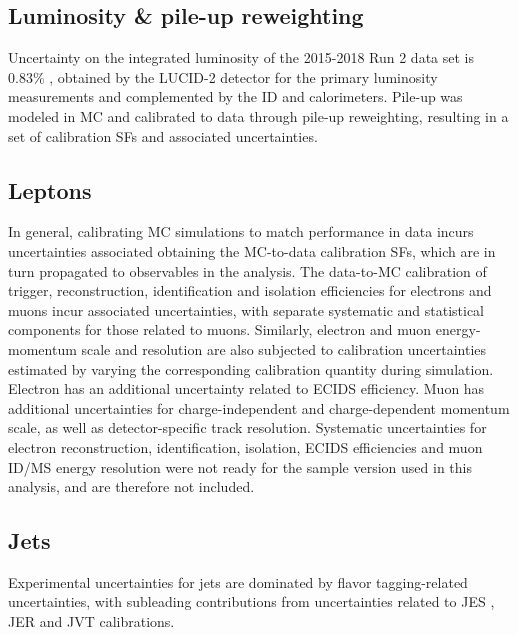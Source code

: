 \documentclass[../thesis.tex]{subfiles}
\begin{document}
\subsection{Luminosity \& pile-up reweighting}
Uncertainty on the integrated luminosity of the 2015-2018 Run 2 data set is $0.83\%$ \citep{DAPR-2021-01}, obtained by the LUCID-2 detector \citep{LUCID2} for the primary luminosity measurements and complemented by the \acs{ID} and calorimeters. Pile-up was modeled in \acs{MC} and calibrated to data through pile-up reweighting, resulting in a set of calibration \acs{SF}s and associated uncertainties.

\subsection{Leptons}
In general, calibrating \acs{MC} simulations to match performance in data incurs uncertainties associated obtaining the MC-to-data calibration \acs{SF}s, which are in turn propagated to observables in the analysis. The data-to-\acs{MC} calibration of trigger, reconstruction, identification and isolation efficiencies for electrons and muons incur associated uncertainties, with separate systematic and statistical components for those related to muons. Similarly, electron and muon energy-momentum scale and resolution are also subjected to calibration uncertainties estimated by varying the corresponding calibration quantity during simulation. Electron has an additional uncertainty related to \acs{ECIDS} efficiency. Muon has additional uncertainties for charge-independent and charge-dependent momentum scale, as well as detector-specific track resolution. Systematic uncertainties for electron reconstruction, identification, isolation, \acs{ECIDS} efficiencies and muon \acs{ID}/\acs{MS} energy resolution were not ready for the sample version used in this analysis, and are therefore not included.

\subsection{Jets}
Experimental uncertainties for jets are dominated by flavor tagging-related uncertainties, with subleading contributions from uncertainties related to \acs{JES} \citep{reco:jet_jes}, \acs{JER} \citep{reco:jet_jer} and \acs{JVT} \citep{syst:jvt_calib} calibrations. 

\end{document}
